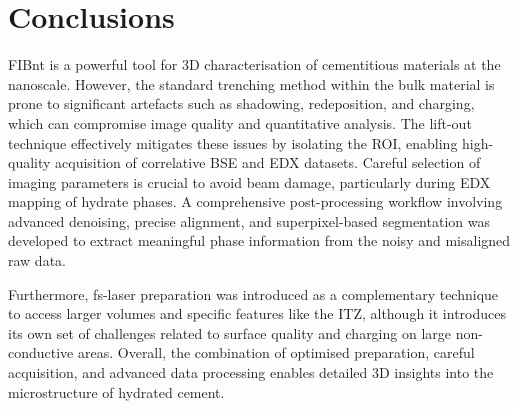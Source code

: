 \section{Conclusions}

\ac{FIBnt} is a powerful tool for 3D characterisation of cementitious materials at the nanoscale.
However, the standard trenching method within the bulk material is prone to significant artefacts such as shadowing, redeposition, and charging, which can compromise image quality and quantitative analysis.
The lift-out technique effectively mitigates these issues by isolating the \ac{ROI}, enabling high-quality acquisition of correlative \ac{BSE} and \ac{EDX} datasets.
Careful selection of imaging parameters is crucial to avoid beam damage, particularly during \ac{EDX} mapping of hydrate phases.
A comprehensive post-processing workflow involving advanced denoising, precise alignment, and superpixel-based segmentation was developed to extract meaningful phase information from the noisy and misaligned raw data.

Furthermore, \ac{fs-laser} preparation was introduced as a complementary technique to access larger volumes and specific features like the \ac{ITZ}, although it introduces its own set of challenges related to surface quality and charging on large non-conductive areas.
Overall, the combination of optimised preparation, careful acquisition, and advanced data processing enables detailed 3D insights into the microstructure of hydrated cement.
